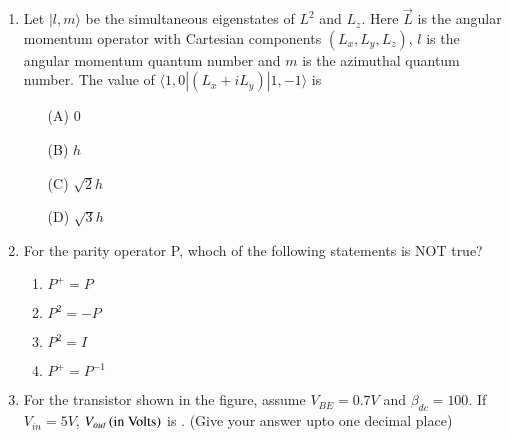 \documentclass[journal]{IEEEtran}
\begin{document}
\begin{enumerate}
\item Let \( |l, m \rangle \) be the simultaneous eigenstates of \( L^2 \) and \( L_z \). Here \( \vec{L} \) is the angular momentum operator with Cartesian components \( (L_x, L_y, L_z) \), \( l \) is the angular momentum quantum number and \( m \) is the azimuthal quantum number. The value of \( \langle 1, 0 | (L_x + iL_y) | 1, -1 \rangle \) is
\begin{multicols}{2}
\begin{enumerate}
    \item[(A)] $0$
    \item[(B)] $h$
    \item[(C)] $\sqrt{2}h$
    \item[(D)] $\sqrt{3}h$
\end{enumerate}
\end{multicols}

\vspace{0.5cm}

\item For the parity operator P, whoch of the following statements is NOT true?
\begin{multicols}{2}
    \begin{enumerate}
        \item $P^+=P$
        \item $P^2=-P$
        \item $P^2=I$
        \item $P^+=P^{-1}$
    \end{enumerate}
\end{multicols}
\vspace{0.5cm}

\item For the transistor shown in the figure, assume $V_{BE}=0.7V$ and $\beta_{dc}=100$. If $V_{in}=5V$, $V_{out}\left(\text{in Volts}\right)$ is \underline{\hspace{2cm}}. (Give your answer upto one decimal place)

\begin{figure}[H]
\centering
{}
\end{figure}
\end{enumerate}
\end{document}
